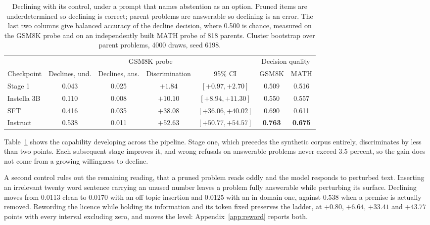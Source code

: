\documentclass{article}
\begin{document}
\begin{table}[t]
\centering
\caption{Declining with its control, under a prompt that names abstention as an option.
Pruned items are underdetermined so declining is correct; parent problems are answerable so
declining is an error. The last two columns give balanced accuracy of the decline decision,
where 0.500 is chance, measured on the GSM8K probe and on an independently built MATH probe
of 818 parents. Cluster bootstrap over parent problems, 4000 draws, seed 6198.}
\label{tab:abstain}
\small
\begin{tabular}{lcccccc}
\toprule
& \multicolumn{4}{c}{GSM8K probe} & \multicolumn{2}{c}{Decision quality} \\
\cmidrule(lr){2-5}\cmidrule(lr){6-7}
Checkpoint & Declines, und. & Declines, ans. & Discrimination & 95\% CI & GSM8K & MATH \\
\midrule
Stage 1     & 0.043 & 0.025 & $+1.84$  & $[+0.97, +2.70]$ & 0.509 & 0.516 \\
Instella 3B & 0.110 & 0.008 & $+10.10$ & $[+8.94, +11.30]$ & 0.550 & 0.557 \\
SFT         & 0.416 & 0.035 & $+38.08$ & $[+36.06, +40.02]$ & 0.690 & 0.611 \\
Instruct    & 0.538 & 0.011 & $\mathbf{+52.63}$ & $[+50.77, +54.57]$ & \textbf{0.763} & \textbf{0.675} \\
\bottomrule
\end{tabular}
\end{table}

Table~\ref{tab:abstain} shows the capability developing across the pipeline. Stage one, which
precedes the synthetic corpus entirely, discriminates by less than two points. Each
subsequent stage improves it, and wrong refusals on answerable problems never exceed 3.5
percent, so the gain does not come from a growing willingness to decline.

A second control rules out the remaining reading, that a pruned problem reads oddly and the
model responds to perturbed text. Inserting an irrelevant twenty word sentence carrying an
unused number leaves a problem fully answerable while perturbing its surface. Declining moves
from 0.0113 clean to 0.0170 with an off topic insertion and 0.0125 with an in domain one,
against 0.538 when a premise is actually removed. Rewording the licence while holding its
information and its token fixed preserves the ladder, at $+0.80$, $+6.64$, $+33.41$ and
$+43.77$ points with every interval excluding zero, and moves the level: Appendix~\ref{app:reword}
reports both.
\end{document}
